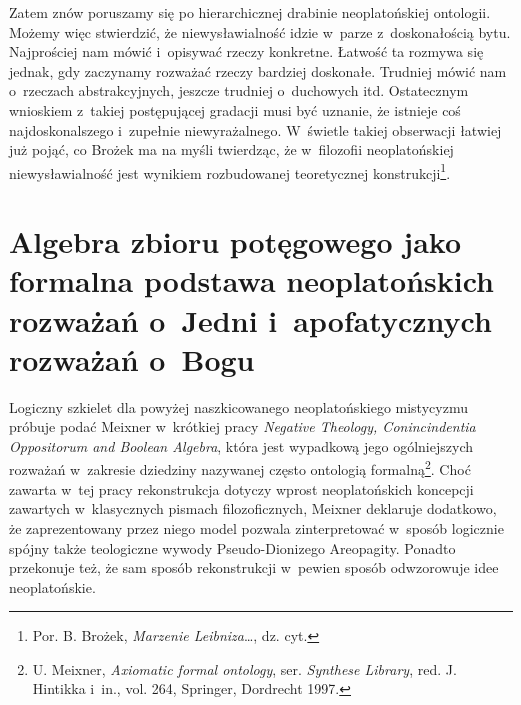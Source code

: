 Zatem znów poruszamy się po hierarchicznej drabinie neoplatońskiej ontologii. Możemy więc stwierdzić, że niewysławialność idzie w~parze z~doskonałością bytu. Najprościej nam mówić i~opisywać rzeczy konkretne. Łatwość ta rozmywa się jednak, gdy zaczynamy rozważać rzeczy bardziej doskonałe. Trudniej mówić nam o~rzeczach abstrakcyjnych, jeszcze trudniej o~duchowych itd. Ostatecznym wnioskiem z~takiej postępującej gradacji musi być uznanie, że istnieje coś najdoskonalszego i~zupełnie niewyrażalnego. W~świetle takiej obserwacji łatwiej już pojąć, co Brożek ma na myśli twierdząc, że w~filozofii neoplatońskiej niewysławialność jest wynikiem rozbudowanej teoretycznej konstrukcji\footnote{Por. B. Brożek, \textit{Marzenie Leibniza}\ldots, dz. cyt.}.





\section{Algebra zbioru potęgowego jako formalna podstawa neoplatońskich rozważań o~Jedni i~apofatycznych rozważań o~Bogu}

Logiczny szkielet dla powyżej naszkicowanego neoplatońskiego mistycyzmu próbuje podać Meixner w~krótkiej pracy \textit{Negative Theology, Conincindentia Oppositorum and Boolean Algebra}, która jest wypadkową jego ogólniejszych rozważań w~zakresie dziedziny nazywanej często ontologią formalną\footnote{U. Meixner, \textit{Axiomatic formal ontology}, ser. \textit{Synthese Library}, red. J. Hintikka i~in., vol. 264, Springer, Dordrecht 1997.}. Choć zawarta w~tej pracy rekonstrukcja dotyczy wprost neoplatońskich koncepcji zawartych w~klasycznych pismach filozoficznych, Mei\-xner deklaruje dodatkowo, że zaprezentowany przez niego model pozwala zinterpretować w~sposób logicznie spójny także teologiczne wywody Pseudo-Dionizego Areopagity. Ponadto przekonuje też, że sam sposób rekonstrukcji w~pewien sposób odwzorowuje idee neoplatońskie.

